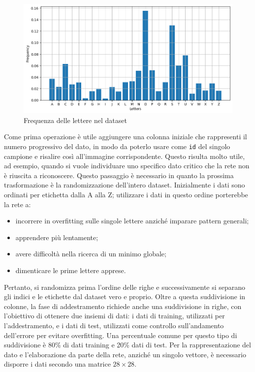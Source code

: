 \documentclass[a4paper,12pt]{article}
\begin{document}
\begin{figure}[H]
    \centering
    \includegraphics[width=1\linewidth]{images/letters_frequency.png}
    \caption{Frequenza delle lettere nel dataset}
    \label{letters_frequency}
\end{figure}

Come prima operazione è utile aggiungere una colonna iniziale che rappresenti il numero progressivo del dato, in modo da poterlo usare come \texttt{id} del singolo campione e risalire così all'immagine corrispondente. Questo risulta molto utile, ad esempio, quando si vuole individuare uno specifico dato critico che la rete non è riuscita a riconoscere. Questo passaggio è necessario in quanto la prossima trasformazione è la randomizzazione dell'intero dataset. Inizialmente i dati sono ordinati per etichetta dalla A alla Z; utilizzare i dati in questo ordine porterebbe la rete a:
\begin{itemize}
    \item incorrere in overfitting sulle singole lettere anziché imparare pattern generali;
    \item apprendere più lentamente;
    \item avere difficoltà nella ricerca di un minimo globale;
    \item dimenticare le prime lettere apprese.
\end{itemize}

Pertanto, si randomizza prima l'ordine delle righe e successivamente si separano gli indici e le etichette dal dataset vero e proprio.
Oltre a questa suddivisione in colonne, la fase di addestramento richiede anche una suddivisione in righe, con l'obiettivo di ottenere due insiemi di dati: i dati di training, utilizzati per l'addestramento, e i dati di test, utilizzati come controllo sull'andamento dell'errore per evitare overfitting. Una percentuale comune per questo tipo di suddivisione è 80\% di dati training e 20\% dati di test.
Per la rappresentazione del dato e l'elaborazione da parte della rete, anziché un singolo vettore, è necessario disporre i dati secondo una matrice $28\times28$.
\end{document}
